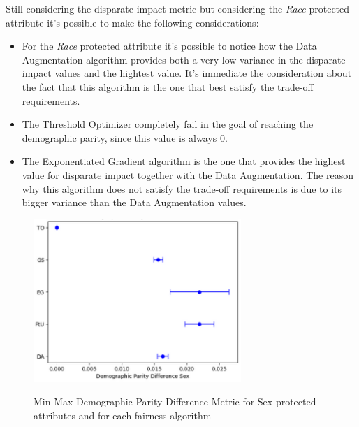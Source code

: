 Still considering the disparate impact metric but considering the \emph{Race} protected attribute it's possible to make the following considerations:

\begin{itemize}

    \item For the \emph{Race} protected attribute it's possible to notice how the Data Augmentation algorithm provides both a very low variance in the disparate impact values and the hightest value. It's immediate the consideration about the fact that this algorithm is the one that best satisfy the trade-off requirements.

    \item The Threshold Optimizer completely fail in the goal of reaching the demographic parity, since this value is always 0.

    \item The Exponentiated Gradient algorithm is the one that provides the highest value for disparate impact together with the Data Augmentation. The reason why this algorithm does not satisfy the trade-off requirements is due to its bigger variance than the Data Augmentation values.

\end{itemize}


\begin{figure}[H]
    \centering
    \includegraphics[width=0.7\textwidth, height=0.7\textwidth]{dpds.png}
    \label{fig:dpds}
    \caption{Min-Max Demographic Parity Difference Metric for Sex protected attributes and for each fairness algorithm}
\end{figure}

